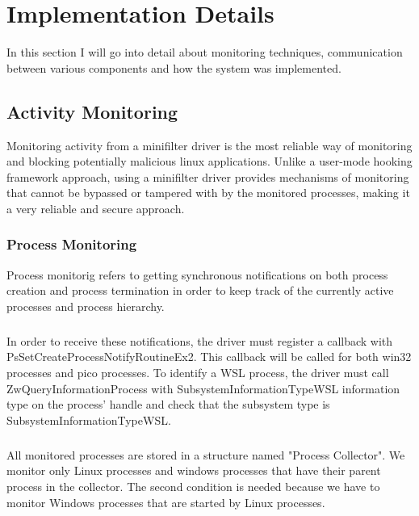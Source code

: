 \chapter{Implementation Details}
    In this section I will go into detail about monitoring techniques, communication between various components and how the system was
    implemented.

    \section{Activity Monitoring}

    Monitoring activity from a minifilter driver is the most reliable way of monitoring and blocking potentially malicious linux applications.
    Unlike a user-mode hooking framework approach, using a minifilter driver provides mechanisms of monitoring that cannot be bypassed or tampered
    with by the monitored processes, making it a very reliable and secure approach.

    \subsection{Process Monitoring}
        Process monitorig refers to getting synchronous notifications on both process creation and process termination in order to keep track
        of the currently active processes and process hierarchy.

        \paragraph{}
        In order to receive these notifications, the driver must register a callback with PsSetCreateProcessNotifyRoutineEx2. This callback will
        be called for both win32 processes and pico processes. To identify a WSL process, the driver must call ZwQueryInformationProcess with
        SubsystemInformationTypeWSL information type on the process' handle and check that the subsystem type is SubsystemInformationTypeWSL.

        \paragraph{}
        All monitored processes are stored in a structure named "Process Collector". We monitor only Linux processes and windows processes that
        have their parent process in the collector. The second condition is needed because we have to monitor Windows processes that are started
        by Linux processes.

